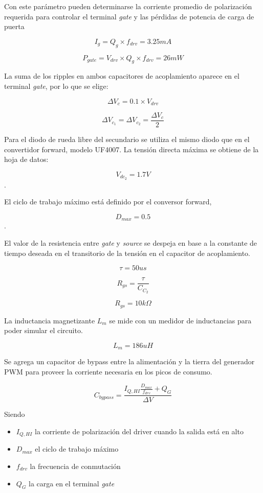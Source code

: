 Con este parámetro pueden determinarse la corriente promedio de polarización requerida para controlar el terminal \textit{gate} 
y las pérdidas de potencia de carga de puerta

$$ I_g=Q_g\times f_{drv}=3.25mA $$

$$ P_{gate}=V_{drv}\times Q_g\times f_{drv}=26mW $$


La suma de los ripples en ambos capacitores de acoplamiento aparece en el terminal \textit{gate},
por lo que se elige:

$$ \Delta V_c=0.1\times V_{drv} $$

$$ \Delta V_{c_1}=\Delta V_{c_2}=\frac{\Delta V_c}{2} $$

Para el diodo de rueda libre del secundario se utiliza el mismo diodo que en el convertidor forward, modelo UF4007. 
La tensión directa máxima se obtiene de la hoja de datos: 

$$ V_{dc_2}=1.7V $$.

El ciclo de trabajo máximo está definido por el conversor forward, 

$$ D_{max}=0.5 $$.

El valor de la resistencia entre \textit{gate} y \textit{source} se despeja en base a la constante de tiempo deseada en el transitorio de la tensión en el capacitor de acoplamiento.

$$ \tau=50us $$


$$ R_{gs}=\frac{\tau}{C_{C_2}} $$

$$ R_{gs}=10k\Omega $$

La inductancia magnetizante $L_m$ se mide con un medidor de inductancias para poder simular el circuito.

$$ L_m=186uH $$



Se agrega un capacitor de bypass entre la alimentación y la tierra del generador PWM para proveer la corriente necesaria en los picos de consumo.


$$ C_{bypass}=\frac{I_{Q,HI}\frac{D_{max}}{f_{drv}}+Q_G}{\Delta V} $$

Siendo

\begin{itemize}
    \item $I_{Q,HI}$ la corriente de polarización del driver cuando la salida está en alto
    \item $D_{max}$ el ciclo de trabajo máximo
    \item $f_{drv}$ la frecuencia de conmutación
    \item $Q_G$ la carga en el terminal \textit{gate}
\end{itemize}

